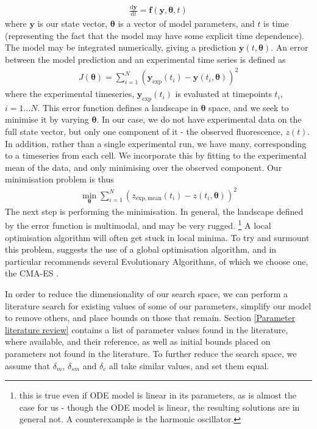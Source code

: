 \documentclass[10pt,journal]{./IEEE_latex_class/IEEEtran}
\begin{document}
\begin{align}
\frac{\mathrm{d}\mathbf{y}}{\mathrm{d}t} = \mathbf{f}(\mathbf{y},\boldsymbol{\theta},t)
\end{align}
where $\mathbf{y}$ is our state vector, $\boldsymbol{\theta}$ is a vector of model parameters, and $t$ is time (representing the fact that the model may have some explicit time dependence). The model may be integrated numerically, giving a prediction $\mathbf{y}(t,\boldsymbol{\theta})$. An error between the model prediction and an experimental time series is defined as
\begin{align}
J(\boldsymbol{\theta}) = \sum_{i =1}^{N} (\mathbf{y}_{\mathrm{exp}}(t_{i}) - \mathbf{y}(t_{i},\boldsymbol{\theta}))^2
\end{align}
where the experimental timeseries, $\mathbf{y}_{\mathrm{exp}}(t_{i})$ is evaluated at timepoints $t_{i}$, $i = 1 \hdots N$. This error function defines a landscape in $\boldsymbol{\theta}$ space, and we seek to minimise it by varying $\boldsymbol{\theta}$. In our case, we do not have experimental data on the full state vector, but only one component of it - the observed fluorescence, $z(t)$. In addition, rather than a single experimental run, we have many, corresponding to a timeseries from each cell. We incorporate this by fitting to the experimental mean of the data, and only minimising over the observed component. Our minimisation problem is thus
\begin{align}
\min_{\boldsymbol{\theta}} \sum_{i =1}^{N} (z_{\mathrm{exp, mean}}(t_{i}) - z(t_{i},\boldsymbol{\theta}))^2
\end{align}
The next step is performing the minimisation. In general, the landscape defined by the error function is multimodal, and may be very rugged. \footnote{this is true even if ODE model is linear in its parameters, as is almost the case for us - though the ODE model is linear, the resulting solutions are in general not. A counterexample is the harmonic oscillator.} A local optimisation algorithm will often get stuck in local minima. To try and surmount this problem, \cite{Algorithms2003} suggests the use of a global optimisation algorithm, and in particular recommends several Evolutionary Algorithms, of which we choose one, the CMA-ES \cite{Hansen2006,Hansen2011}. 

In order to reduce the dimensionality of our search space, we can perform a literature search for existing values of some of our parameters, simplify our model to remove others, and place bounds on those that remain. Section \ref{Parameter literature review} contains a list of parameter values found in the literature, where available, and their reference, as well as initial bounds placed on parameters not found in the literature. To further reduce the search space, we assume that $\delta_m$, $\delta_{sm}$ and $\delta_c$ all take similar values, and set them equal.
\end{document}
